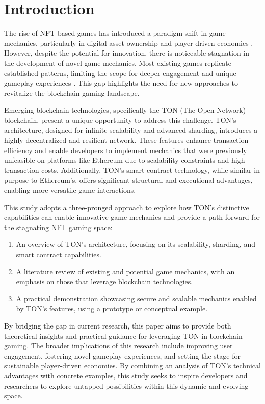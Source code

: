 \chapter{Introduction}


The rise of NFT-based games has introduced a paradigm shift in game mechanics,
particularly in digital asset ownership and player-driven economies
\cite{min_blockchain_2019}. However, despite the potential for innovation, there
is noticeable stagnation in the development of novel game mechanics. Most
existing games replicate established patterns, limiting the scope for deeper
engagement and unique gameplay experiences \cite{jiang_cryptokitties_2021}. This
gap highlights the need for new approaches to revitalize the blockchain gaming
landscape.

Emerging blockchain technologies, specifically the TON (The Open Network)
blockchain, present a unique opportunity to address this challenge. TON’s
architecture, designed for infinite scalability and advanced sharding,
introduces a highly decentralized and resilient network. These features enhance
transaction efficiency and enable developers to implement mechanics that were
previously unfeasible on platforms like Ethereum due to scalability constraints
and high transaction costs.
Additionally, TON’s smart contract technology, while similar in purpose to
Ethereum’s, offers significant structural and executional advantages, enabling
more versatile game interactions\cite{durov_telegram_nodate}.

This study adopts a three-pronged approach to explore how TON’s distinctive
capabilities can enable innovative game mechanics and provide a path forward for
the stagnating NFT gaming space:
\begin{enumerate}
	\item An overview of TON’s architecture, focusing on its scalability,
	      sharding, and smart contract capabilities.
	\item A literature review of existing and potential game mechanics, with an
	      emphasis on those that leverage blockchain technologies.
	\item A practical demonstration showcasing secure and scalable mechanics
	      enabled by TON’s features, using a prototype or conceptual example.
\end{enumerate}

By bridging the gap in current research, this paper aims to provide both
theoretical insights and practical guidance for leveraging TON in blockchain
gaming. The broader implications of this research include improving user
engagement, fostering novel gameplay experiences, and setting the stage for
sustainable player-driven economies. By combining an analysis of TON’s technical
advantages with concrete examples, this study seeks to inspire developers and
researchers to explore untapped possibilities within this dynamic and evolving
space.

